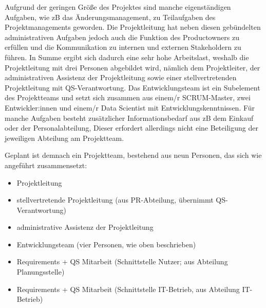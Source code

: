 Aufgrund der geringen Größe des Projektes sind manche eigenständigen Aufgaben, wie zB das Änderungsmanagement, zu Teilaufgaben des Projektmanagements geworden. Die Projektleitung hat neben diesen gebündelten administrativen Aufgaben jedoch auch die Funktion des Productowners zu erfüllen und die Kommunikation zu internen und externen Stakeholdern zu führen. In Summe ergibt sich dadurch eine sehr hohe Arbeitslast, weshalb die Projektleitung mit drei Personen abgebildet wird, nämlich dem Projektleiter, der administrativen Assistenz der Projektleitung sowie einer stellvertretenden Projektleitung mit QS-Verantwortung.
Das Entwicklungsteam ist ein Subelement des Projektteams und setzt sich zusammen aus einem/r SCRUM-Master, zwei Entwickler:innen und einem/r Data Scientist mit Entwicklungskenntnissen.
Für manche Aufgaben besteht zusätzlicher Informationsbedarf aus zB dem Einkauf oder der Personalabteilung, Dieser erfordert allerdings nicht eine Beteiligung der jeweiligen Abteilung am Projektteam. 

Geplant ist demnach ein Projektteam, bestehend aus neun Personen, das sich wie angeführt zusammensetzt: 
\begin{itemize}
	\itemsep-8pt
	\item Projektleitung
	\item stellvertretende Projektleitung (aus PR-Abteilung, übernimmt QS-Verantwortung)
	\item administrative Assistenz der Projektleitung
	\item Entwicklungsteam (vier Personen, wie oben beschrieben)
	\item Requirements + QS Mitarbeit (Schnittstelle Nutzer; aus Abteilung Planungsstelle)
	\item Requirements + QS Mitarbeit (Schnittstelle IT-Betrieb, aus Abteilung IT-Betrieb)
\end{itemize}
